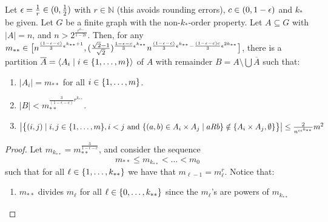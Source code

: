     \begin{theorem}[Theorem 4.16] \label{thm:existance_of_equitative_partition_with_perfect_pairs_but_with_bound_exceptional_pairs}
        Let $\epsilon = \frac{1}{r} \in ( 0, \frac{1}{2} )$ with $r \in \mathbb{N}$ (this avoids rounding errors),
        $c\in ( 0,1-\epsilon )$ and $k_*$ be given.
        Let $G$ be a finite graph with the non-$k_*$-order property.
        Let $A \subseteq G$ with $|A| = n$, and $n > 2^{\frac{r^{k_{**}}}{1-2\epsilon}}$.
        Then, for any $m_{**} \in \bigl[ n^{\frac{(1-\epsilon-c)}{3}\epsilon^{k_{**}+1}},
        ( \frac{\sqrt{2}-1}{\sqrt{2}} )^{\frac{1-\epsilon-c}{3}\epsilon^{k_{**}}} n^{\frac{(1-\epsilon-c)}{3}\epsilon^{k_{**}} -
        \frac{(1-\epsilon-c)c}{3}\epsilon^{2k_{**}}} \bigr]$, there is a partition
        $\overline{A} = \left< A_i \mid i \in \{ 1, \dots, m \} \right>$ of $A$ with remainder
        $B = A \setminus \bigcup \overline{A}$ such that:
        \begin{enumerate}
            \item\label{itm:existance_of_equitative_partition_with_perfect_pairs_but_with_bound_exceptional_pairs.1}
                $|A_i| = m_{**}$ for all $i \in \{ 1, \dots, m \}$.
            \item\label{itm:existance_of_equitative_partition_with_perfect_pairs_but_with_bound_exceptional_pairs.2}
                $|B| < m_{**}^{\frac{3}{(1-\epsilon-c)}r^{k_{**}}}$.
            \item\label{itm:existance_of_equitative_partition_with_perfect_pairs_but_with_bound_exceptional_pairs.3}
                $\bigl| \bigl\{  (i,j) \mid i,j \in \{ 1, \dots, m \}, i < j \text{ and }
                \{ (a,b) \in A_i \times A_j \mid a R b \} \notin
                \{ A_i \times A_j, \emptyset \} \bigr\} \bigr|
                \leq \frac{2}{n^{c\epsilon^{k_{**}}}} m^2$
        \end{enumerate}
        \begin{proof}
            Let $m_{k_{**}} = m_{**}^{\frac{3}{1-\epsilon-c}}$, and consider the sequence
            \[
                m_{**} \leq m_{k_{**}} < \dots < m_0
            \]
            such that for all $\ell \in \{ 1, \dots, k_{**} \}$ we have that $m_{\ell-1} = m_\ell^r$.
            Notice that:
            \begin{enumerate}
                \item $m_{**}$ divides $m_\ell$ for all $\ell \in \{ 0, \dots, k_{**} \}$ since the $m_\ell$'s are powers of $m_{k_{**}}$

\end{enumerate}
\end{proof}
\end{theorem}
